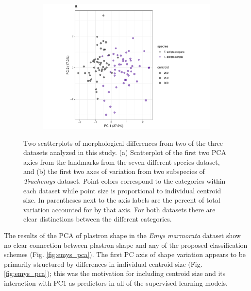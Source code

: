 \documentclass[12pt,letterpaper]{article}
\begin{document}
\begin{figure}[ht]
  \begin{subfigure}[b]{0.7\textwidth}
    \caption{}
    \includegraphics[width = \textwidth]{figure/tra_pc_graph}
  \end{subfigure}
  \caption{Two scatterplots of morphological differences from two of the three datasets analyzed in this study. (a) Scatterplot of the first two PCA axies from the landmarks from the seven different species dataset, and (b) the first two axes of variation from two subspecies of \textit{Trachemys} dataset. Point colors correspond to the categories within each dataset while point size is proportional to individual centroid size. In parentheses next to the axis labels are the percent of total variation accounted for by that axis. For both datasets there are clear distinctions between the different categories.}
  \label{fig:other_pca}
\end{figure}


The results of the PCA of plastron shape in the \textit{Emys marmorata} dataset show no clear connection between plastron shape and any of the proposed classification schemes (Fig. \ref{fig:emys_pca}). The first PC axis of shape variation appears to be primarily structured by differences in individual centroid size (Fig. \ref{fig:emys_pca}); this was the motivation for including centroid size and its interaction with PC1 as predictors in all of the supervised learning models.
\end{document}
